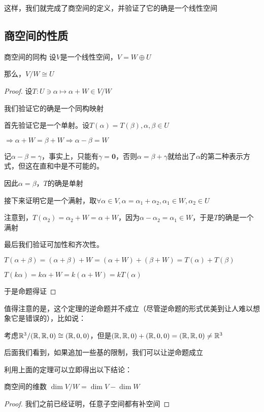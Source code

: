 \documentclass[12pt, a4paper, oneside, UTF8]{ctexbook}
\begin{document}
			这样，我们就完成了商空间的定义，并验证了它的确是一个线性空间
		\subsection{商空间的性质}
			\begin{para}{0}
				\point{}
					\begin{them}{}{商空间的同构}{}
						设$V$是一个线性空间，$V = W \oplus U$

						那么，$V/W \cong U$
					\end{them}
					\begin{proof}
						设$T:U \ni \alpha \mapsto \alpha + W \in V/W$

						我们验证它的确是一个同构映射

						首先验证它是一个单射。设$T(\alpha )=T(\beta ),\alpha ,\beta \in U$

						$\Rightarrow \alpha +W=\beta +W \Rightarrow \alpha -\beta =W$

						记$\alpha -\beta =\gamma $，事实上，只能有$\gamma =\mathbf{0}$，否则$\alpha =\beta + \gamma $就给出了$\alpha $的第二种表示方式，但这在直和中是不可能的。

						因此$\alpha =\beta$，$T$的确是单射

						接下来证明它是一个满射，取$\forall \alpha \in V,\alpha = \alpha_1+\alpha_2,\alpha_1 \in W,\alpha_2 \in U$

						注意到，$T(\alpha_2) = \alpha_2+W=\alpha + W$，因为$\alpha -\alpha_2 = \alpha_1 \in W$，于是$T$的确是一个满射
					
						最后我们验证可加性和齐次性。

						$T(\alpha +\beta )=(\alpha +\beta )+W = (\alpha +W)+(\beta +W)=T(\alpha )+T(\beta)$

						$T(k\alpha )=k\alpha + W=k(\alpha +W)=kT(\alpha )$

						于是命题得证
						
						
					\end{proof}
					值得注意的是，这个定理的逆命题并不成立（尽管逆命题的形式优美到让人难以想象它是错误的），比如说：
					
					考虑$\mathbb{R}^3 / {(\mathbb{R},\mathbb{R},0)} \cong (\mathbb{R},0,0)$，但是$(\mathbb{R},\mathbb{R},0) + (\mathbb{R},0,0) = (\mathbb{R},\mathbb{R},0) \neq \mathbb{R}^3$

					后面我们看到，如果追加一些基的限制，我们可以让逆命题成立
					
					利用上面的定理可以立即得出以下结论：
					\begin{corollary}{商空间的维数}{}
						$\dim V/W = \dim V-\dim W$
					\end{corollary}
					\begin{proof}
						我们之前已经证明，任意子空间都有补空间


\end{proof}
\end{para}
\end{document}
